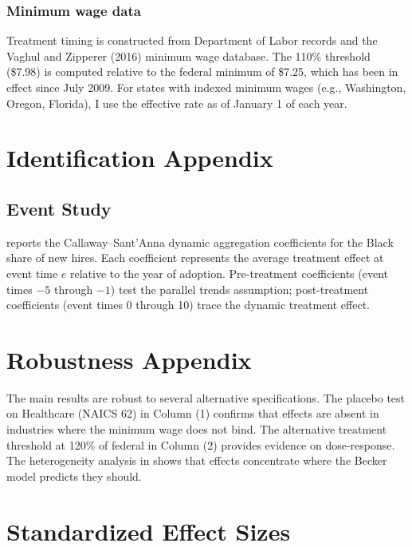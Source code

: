 \documentclass[12pt]{article}
\begin{document}
\subsubsection*{Minimum wage data}  Treatment timing is constructed from Department of Labor records and the Vaghul and Zipperer (2016) minimum wage database. The 110\% threshold (\$7.98) is computed relative to the federal minimum of \$7.25, which has been in effect since July 2009. For states with indexed minimum wages (e.g., Washington, Oregon, Florida), I use the effective rate as of January 1 of each year.

\section{Identification Appendix}

\subsection{Event Study}



 reports the Callaway--Sant'Anna dynamic aggregation coefficients for the Black share of new hires. Each coefficient represents the average treatment effect at event time $e$ relative to the year of adoption. Pre-treatment coefficients (event times $-5$ through $-1$) test the parallel trends assumption; post-treatment coefficients (event times 0 through 10) trace the dynamic treatment effect.

\section{Robustness Appendix}

The main results are robust to several alternative specifications. The placebo test on Healthcare (NAICS 62) in  Column (1) confirms that effects are absent in industries where the minimum wage does not bind. The alternative treatment threshold at 120\% of federal in Column (2) provides evidence on dose-response. The heterogeneity analysis in  shows that effects concentrate where the Becker model predicts they should.

\section{Standardized Effect Sizes}
\label{sec:sde}


\end{document}
